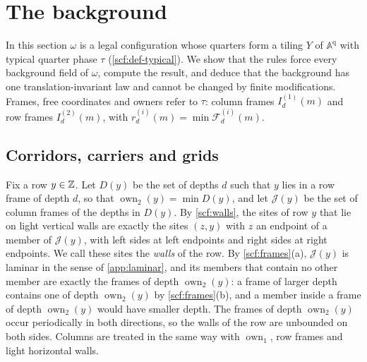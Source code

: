 \section{The background}\label{sec:background}

In this section $\omega$ is a legal configuration whose quarters form a tiling $Y$ of $\mathbb A^{\mathrm q}$ with typical quarter phase $\tau$ (\cref{scf:def-typical}). We show that the rules force every background field of $\omega$, compute the result, and deduce that the background has one translation-invariant law and cannot be changed by finite modifications. Frames, free coordinates and owners refer to $\tau$: column frames $I^{(1)}_d(m)$ and row frames $I^{(2)}_d(m)$, with $r^{(i)}_d(m)=\min\mathcal F^{(i)}_d(m)$.

\subsection{Corridors, carriers and grids}

Fix a row $y\in\mathbb{Z}$. Let $D(y)$ be the set of depths $d$ such that $y$ lies in a row frame of depth $d$, so that $\operatorname{own}_2(y)=\min D(y)$, and let $\mathcal J(y)$ be the set of column frames of the depths in $D(y)$. By \cref{scf:walls}, the sites of row $y$ that lie on light vertical walls are exactly the sites $(z,y)$ with $z$ an endpoint of a member of $\mathcal J(y)$, with left sides at left endpoints and right sides at right endpoints. We call these sites the \emph{walls} of the row. By \cref{scf:frames}(a), $\mathcal J(y)$ is laminar in the sense of \cref{app:laminar}, and its members that contain no other member are exactly the frames of depth $\operatorname{own}_2(y)$: a frame of larger depth contains one of depth $\operatorname{own}_2(y)$ by \cref{scf:frames}(b), and a member inside a frame of depth $\operatorname{own}_2(y)$ would have smaller depth. The frames of depth $\operatorname{own}_2(y)$ occur periodically in both directions, so the walls of the row are unbounded on both sides. Columns are treated in the same way with $\operatorname{own}_1$, row frames and light horizontal walls.

